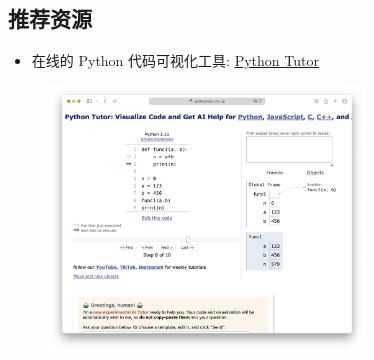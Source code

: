 \documentclass{ctexbeamer}
\begin{document}
        \subsection{推荐资源}
        \begin{frame}
            \begin{itemize}
                \item 在线的 Python 代码可视化工具: \href{https://pythontutor.com/python-compiler.html}{Python Tutor}
            \end{itemize}
            \begin{figure}
                \centering
                \includegraphics[width=0.75\textwidth]{./images/pythontutor.png}
            \end{figure}
        \end{frame}
        
\end{document}
